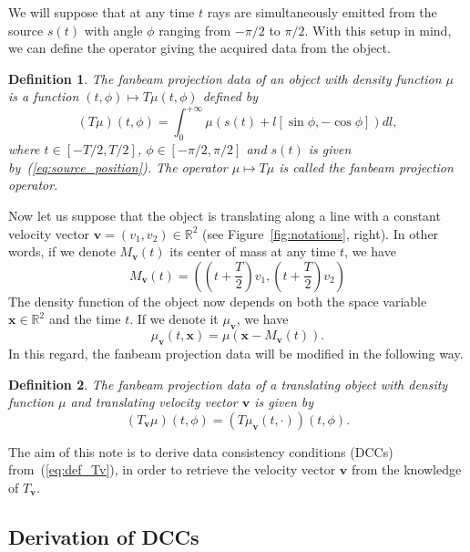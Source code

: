 \documentclass[a4paper]{article}
\numberwithin{equation}{section}
\newcommand{\R}{\mathbb{R}}
\newcommand{\bx}{\mathbf{x}}
\newcommand{\bv}{\mathbf{v}}
\newcommand{\Mbv}{M_{\mathbf{v}}}
\newcommand{\Tbv}{T_{\mathbf{v}}}
\newcommand{\mubv}{\mu_{\mathbf{v}}}
\newtheorem{definition}{Definition}
\begin{document}
We will suppose that at any time $t$ rays are simultaneously emitted from the source $s(t)$ with angle $\phi$ ranging from $-\pi/2$ to $\pi/2$. With this setup in mind, we can define the operator giving the acquired data from the object.
\begin{definition}
The \emph{fanbeam projection data} of an object with density function $\mu$ is a function $(t,\phi) \mapsto T\mu(t,\phi)$ defined by
\begin{equation}
	(T\mu)(t,\phi) = \int_0^{+\infty} \mu \left( s(t) + l \left[ \sin \phi, -\cos \phi \right] \right) dl,
\end{equation}
where $t \in \left[ -T/2, T/2\right]$, $\phi \in \left[ -\pi/2, \pi/2\right]$ and $s(t)$ is given by~(\ref{eq:source_position}). The operator $\mu \mapsto T\mu$ is called the \emph{fanbeam projection operator}.
\end{definition}


Now let us suppose that the object is translating along a line with a constant velocity vector $\bv = (v_1, v_2)\in \R^2$ (see Figure~\ref{fig:notations}, right). In other words, if we denote $\Mbv(t)$ its center of mass at any time $t$, we have
\begin{equation}
	\Mbv(t) =  \left( \left( t + \frac{T}{2} \right)v_1, \left( t + \frac{T}{2} \right)v_2 \right)
\label{eq:center_of_mass}
\end{equation}
The density function of the object now depends on both the space variable $\bx \in \R^2$ and the time $t$. If we denote it $\mubv$, we have
\begin{equation}
	\mubv(t,\bx) = \mu\left( \bx - \Mbv(t)\right).
\end{equation}
In this regard, the fanbeam projection data will be modified in the following way.
\begin{definition}
The \emph{fanbeam projection data of a translating object} with density function $\mu$ and translating velocity vector $\bv$ is given by
\begin{equation}
	(\Tbv\mu)(t,\phi) = \left( T \mubv(t,\cdot) \right)(t,\phi).
\label{eq:def_Tv}
\end{equation}
\end{definition}

The aim of this note is to derive data consistency conditions (DCCs) from~(\ref{eq:def_Tv}), in order to retrieve the velocity vector $\bv$ from the knowledge of $\Tbv$.

\subsection{Derivation of DCCs}
\end{document}
